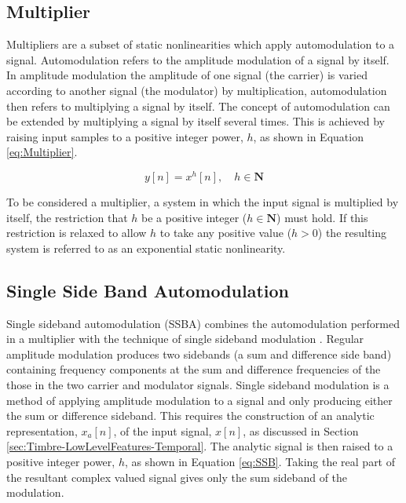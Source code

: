 	\subsection{Multiplier}
	\label{sec:Excitation-Methods-Multiplier}
		Multipliers are a subset of static nonlinearities which apply automodulation to a signal. Automodulation
		refers to the amplitude modulation of a signal by itself. In amplitude modulation the amplitude of one
		signal (the carrier) is varied according to another signal (the modulator) by multiplication, automodulation
		then refers to multiplying a signal by itself. The concept of automodulation can be extended by multiplying
		a signal by itself several times. This is achieved by raising input samples to a positive integer power,
		$h$, as shown in Equation \ref{eq:Multiplier}.

		\begin{equation}
			y[n] = x^{h}[n], \quad h \in \textbf{N}
			\label{eq:Multiplier}
		\end{equation}

		To be considered a multiplier, a system in which the input signal is multiplied by itself, the restriction
		that $h$ be a positive integer ($h \in \textbf{N}$) must hold. If this restriction is relaxed to allow $h$
		to take any positive value ($h > 0$) the resulting system is referred to as an exponential static
		nonlinearity.

	\subsection{Single Side Band Automodulation}
	\label{sec:Excitation-Methods-SSBA}
		Single sideband automodulation (SSBA) combines the automodulation performed in a multiplier with the
		technique of single sideband modulation \citep{corinthios2009signals}. Regular amplitude modulation produces
		two sidebands (a sum and difference side band) containing frequency components at the sum and difference
		frequencies of the those in the two carrier and modulator signals. Single sideband modulation is a method of
		applying amplitude modulation to a signal and only producing either the sum or difference sideband. This
		requires the construction of an analytic representation, $x_{a}[n]$, of the input signal, $x[n]$, as
		discussed in Section \ref{sec:Timbre-LowLevelFeatures-Temporal}. The analytic signal is then raised to a
		positive integer power, $h$, as shown in Equation \ref{eq:SSB}. Taking the real part of the resultant
		complex valued signal gives only the sum sideband of the modulation.

